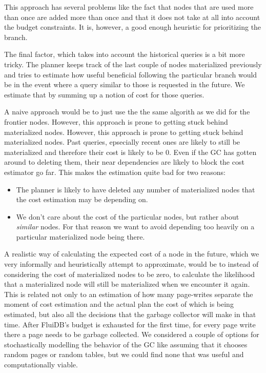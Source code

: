 This approach has several problems like the fact that nodes that are
used more than once are added more than once and that it does not take
at all into account the budget constraints. It is, however, a good
enough heuristic for prioritizing the branch.

The final factor, which takes into account the historical queries is a
bit more tricky. The planner keeps track of the last couple of nodes
materialized previously and tries to estimate how useful beneficial
following the particular branch would be in the event where a query
similar to those is requested in the future. We estimate that by
summing up a notion of cost for those queries.

A naive approach would be to just use the the same algorith as we did
for the frontier nodes. However, this approach is prone to getting
stuck behind materialized nodes. However, this approach is
prone to getting stuck behind materialized nodes. Past queries,
epsecially recent ones are likely to still be materialized and
therefore their cost is likely to be 0. Even if the GC has gotten
around to deleting them, their near dependencies are likely to block
the cost estimator go far. This makes the estimation quite bad for two
reasons:

\begin{itemize}
\item The planner is likely to have deleted any number of materialized
nodes that the cost estimation may be depending on.
\item We don't care about the cost of the particular nodes, but rather
about \emph{similar} nodes. For that reason we want to avoid depending
too heavily on a particular materialized node being there.
\end{itemize}

A realistic way of calculating the expected cost of a node in the
future, which we very informally and heuristically attempt to
approximate, would be to instead of considering the cost of
materialized nodes to be zero, to calculate the likelihood that a
materialized node will still be materialized when we encounter it
again. This is related not only to an estimation of how many
page-writes separate the moment of cost estimation and the actual plan
the cost of which is being estimated, but also all the decisions that
the garbage collector will make in that time. After FluiDB's budget is
exhausted for the first time, for every page write there a page needs
to be garbage collected. We considered a couple of options for
stochastically modelling the behavior of the GC like assuming that it
chooses random pages or random tables, but we could find none that was
useful and computationally viable.

